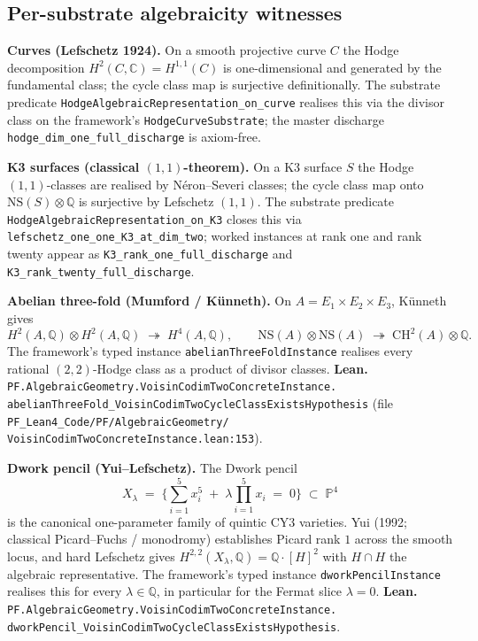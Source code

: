 \documentclass[11pt,a4paper]{article}
\theoremstyle{plain}
\theoremstyle{definition}
\begin{document}
\subsection{Per-substrate algebraicity witnesses}

\textbf{Curves (Lefschetz 1924).}
On a smooth projective curve $C$ the Hodge decomposition $H^{2}(C,
\mathbb{C}) = H^{1, 1}(C)$ is one-dimensional and generated by the
fundamental class; the cycle class map is surjective definitionally.
The substrate predicate \texttt{HodgeAlgebraicRepresentation\_on\_curve}
realises this via the divisor class on the framework's
\texttt{HodgeCurveSubstrate}; the master discharge
\texttt{hodge\_dim\_one\_full\_discharge} is axiom-free.

\textbf{K3 surfaces (classical $(1,1)$-theorem).}
On a K3 surface $S$ the Hodge $(1, 1)$-classes are realised by
N\'eron--Severi classes; the cycle class map onto $\mathrm{NS}(S)
\otimes \mathbb{Q}$ is surjective by Lefschetz $(1,1)$. The substrate
predicate
\texttt{HodgeAlgebraicRepresentation\_on\_K3} closes this via
\texttt{lefschetz\_one\_one\_K3\_at\_dim\_two}; worked instances at
rank one and rank twenty appear as
\texttt{K3\_rank\_one\_full\_discharge} and
\texttt{K3\_rank\_twenty\_full\_discharge}.

\textbf{Abelian three-fold (Mumford / K\"unneth).}
On $A = E_{1} \times E_{2} \times E_{3}$, K\"unneth gives
\[
H^{2}(A, \mathbb{Q}) \otimes H^{2}(A, \mathbb{Q})
\;\twoheadrightarrow\;
H^{4}(A, \mathbb{Q}),
\qquad
\mathrm{NS}(A) \otimes \mathrm{NS}(A)
\;\twoheadrightarrow\;
\mathrm{CH}^{2}(A) \otimes \mathbb{Q}.
\]
The framework's typed instance
\texttt{abelianThreeFoldInstance} realises every rational $(2,2)$-Hodge
class as a product of divisor classes. \textbf{Lean.}
\texttt{PF.AlgebraicGeometry.VoisinCodimTwoConcreteInstance.\\
abelianThreeFold\_VoisinCodimTwoCycleClassExistsHypothesis}
(file
\texttt{PF\_Lean4\_Code/PF/AlgebraicGeometry/\\
VoisinCodimTwoConcreteInstance.lean:153}).

\textbf{Dwork pencil (Yui--Lefschetz).}
The Dwork pencil
\begin{equation}
\label{eq:dwork}
X_{\lambda}
\;=\;
\bigg\{ \sum_{i = 1}^{5} x_{i}^{5}
\;+\; \lambda \prod_{i=1}^{5} x_{i} \;=\; 0 \bigg\}
\;\subset\; \mathbb{P}^{4}
\end{equation}
is the canonical one-parameter family of quintic CY$3$ varieties.
Yui (1992; classical Picard--Fuchs / monodromy) establishes Picard
rank $1$ across the smooth locus, and hard Lefschetz gives
$H^{2, 2}(X_{\lambda}, \mathbb{Q}) = \mathbb{Q} \cdot [H]^{2}$ with
$H \cap H$ the algebraic representative. The framework's typed
instance \texttt{dworkPencilInstance} realises this for every
$\lambda \in \mathbb{Q}$, in particular for the Fermat slice
$\lambda = 0$. \textbf{Lean.}
\texttt{PF.AlgebraicGeometry.VoisinCodimTwoConcreteInstance.\\
dworkPencil\_VoisinCodimTwoCycleClassExistsHypothesis}.
\end{document}
